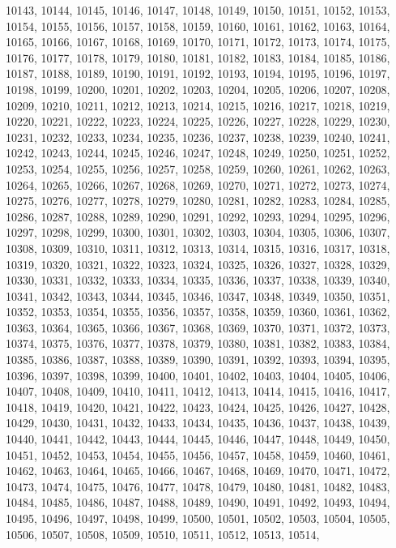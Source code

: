 10143,
10144,
10145,
10146,
10147,
10148,
10149,
10150,
10151,
10152,
10153,
10154,
10155,
10156,
10157,
10158,
10159,
10160,
10161,
10162,
10163,
10164,
10165,
10166,
10167,
10168,
10169,
10170,
10171,
10172,
10173,
10174,
10175,
10176,
10177,
10178,
10179,
10180,
10181,
10182,
10183,
10184,
10185,
10186,
10187,
10188,
10189,
10190,
10191,
10192,
10193,
10194,
10195,
10196,
10197,
10198,
10199,
10200,
10201,
10202,
10203,
10204,
10205,
10206,
10207,
10208,
10209,
10210,
10211,
10212,
10213,
10214,
10215,
10216,
10217,
10218,
10219,
10220,
10221,
10222,
10223,
10224,
10225,
10226,
10227,
10228,
10229,
10230,
10231,
10232,
10233,
10234,
10235,
10236,
10237,
10238,
10239,
10240,
10241,
10242,
10243,
10244,
10245,
10246,
10247,
10248,
10249,
10250,
10251,
10252,
10253,
10254,
10255,
10256,
10257,
10258,
10259,
10260,
10261,
10262,
10263,
10264,
10265,
10266,
10267,
10268,
10269,
10270,
10271,
10272,
10273,
10274,
10275,
10276,
10277,
10278,
10279,
10280,
10281,
10282,
10283,
10284,
10285,
10286,
10287,
10288,
10289,
10290,
10291,
10292,
10293,
10294,
10295,
10296,
10297,
10298,
10299,
10300,
10301,
10302,
10303,
10304,
10305,
10306,
10307,
10308,
10309,
10310,
10311,
10312,
10313,
10314,
10315,
10316,
10317,
10318,
10319,
10320,
10321,
10322,
10323,
10324,
10325,
10326,
10327,
10328,
10329,
10330,
10331,
10332,
10333,
10334,
10335,
10336,
10337,
10338,
10339,
10340,
10341,
10342,
10343,
10344,
10345,
10346,
10347,
10348,
10349,
10350,
10351,
10352,
10353,
10354,
10355,
10356,
10357,
10358,
10359,
10360,
10361,
10362,
10363,
10364,
10365,
10366,
10367,
10368,
10369,
10370,
10371,
10372,
10373,
10374,
10375,
10376,
10377,
10378,
10379,
10380,
10381,
10382,
10383,
10384,
10385,
10386,
10387,
10388,
10389,
10390,
10391,
10392,
10393,
10394,
10395,
10396,
10397,
10398,
10399,
10400,
10401,
10402,
10403,
10404,
10405,
10406,
10407,
10408,
10409,
10410,
10411,
10412,
10413,
10414,
10415,
10416,
10417,
10418,
10419,
10420,
10421,
10422,
10423,
10424,
10425,
10426,
10427,
10428,
10429,
10430,
10431,
10432,
10433,
10434,
10435,
10436,
10437,
10438,
10439,
10440,
10441,
10442,
10443,
10444,
10445,
10446,
10447,
10448,
10449,
10450,
10451,
10452,
10453,
10454,
10455,
10456,
10457,
10458,
10459,
10460,
10461,
10462,
10463,
10464,
10465,
10466,
10467,
10468,
10469,
10470,
10471,
10472,
10473,
10474,
10475,
10476,
10477,
10478,
10479,
10480,
10481,
10482,
10483,
10484,
10485,
10486,
10487,
10488,
10489,
10490,
10491,
10492,
10493,
10494,
10495,
10496,
10497,
10498,
10499,
10500,
10501,
10502,
10503,
10504,
10505,
10506,
10507,
10508,
10509,
10510,
10511,
10512,
10513,
10514,
